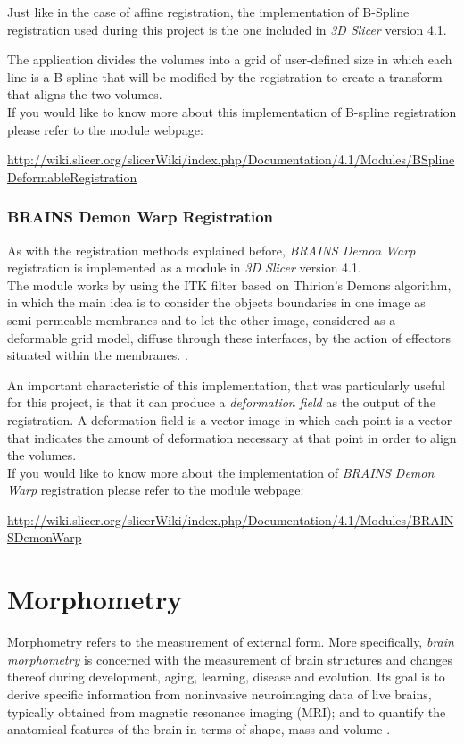 Just like in the case of affine registration, the implementation of
B-Spline registration used during this project is the one included in
\textit{3D Slicer} version 4.1. 

The application divides the volumes into a grid of user-defined size
in which each line is a B-spline that will be modified by the
registration to create a transform that aligns the two volumes.\\

If you would like to know more about this implementation of B-spline
registration please refer to the module webpage:

\url{http://wiki.slicer.org/slicerWiki/index.php/Documentation/4.1/Modules/BSplineDeformableRegistration}


\subsubsection{BRAINS Demon Warp Registration}
As with the registration methods explained before, \textit{BRAINS
  Demon Warp} registration is implemented as a module in \textit{3D
  Slicer} version
4.1.\\

The module works by using the ITK filter based on Thirion's Demons
algorithm, in which the main idea is to consider the objects
boundaries in one image as semi-permeable membranes and to let the
other image, considered as a deformable grid model, diffuse through
these interfaces, by the action of effectors situated within the
membranes. \cite{thirion}.

An important characteristic of this implementation, that was
particularly useful for this project, is that it can produce a
\textit{deformation field} as the output of the registration. A
deformation field is a vector image in which each point is a vector
that indicates the amount of deformation necessary
at that point in order to align the volumes.\\


If you would like to know more about the implementation of
\textit{BRAINS Demon Warp} registration please refer to the module
webpage:

\url{http://wiki.slicer.org/slicerWiki/index.php/Documentation/4.1/Modules/BRAINSDemonWarp}


\section{Morphometry}
Morphometry refers to the measurement of external form. More
specifically, \textit{brain morphometry} is concerned with the
measurement of brain structures and changes thereof during
development, aging, learning, disease and evolution. Its goal is to
derive specific information from noninvasive neuroimaging data of live
brains, typically obtained from magnetic resonance imaging (MRI); and
to quantify the anatomical features of the brain in terms of shape,
mass and volume \cite{brmorph}.\\

